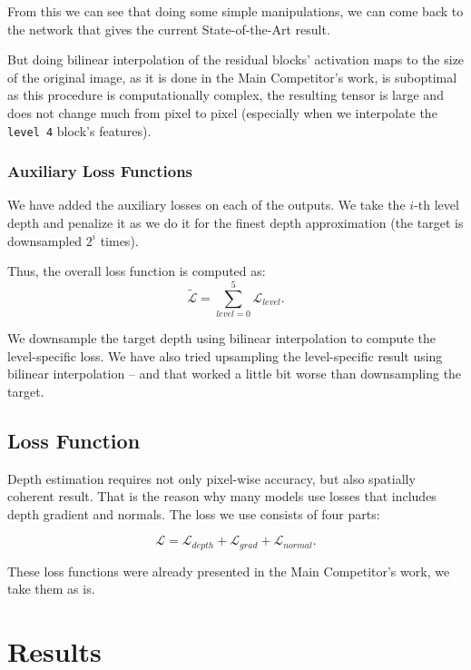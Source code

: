 \documentclass[10pt,twocolumn,letterpaper]{article}
\begin{document}
From this we can see that doing some simple manipulations, we can
come back to the network that gives the current State-of-the-Art result.

But doing bilinear interpolation of the residual blocks' activation maps
to the size of the original image, as it is done in the Main Competitor's work,
is suboptimal as this procedure is
computationally complex, the resulting tensor is large and does not change much from
pixel to pixel (especially when we interpolate the \texttt{level 4}
block's features).

\subsubsection{Auxiliary Loss Functions}

We have
added the auxiliary losses on each of the outputs. We take the $i$-th level depth
and penalize it as we do it for the finest depth approximation (the target is downsampled
$2^i$ times).

Thus, the overall loss function is computed as:
\begin{equation}
    \mathcal{\tilde{L}} = \sum_{level=0}^5 \mathcal{L}_{level}.
\end{equation}

We downsample the target depth using bilinear interpolation to compute the level-specific loss.
We have also tried upsampling the level-specific result using bilinear interpolation -- 
and that worked a little bit worse than downsampling the target.

\subsection{Loss Function}

Depth estimation requires not only pixel-wise accuracy, but also spatially 
coherent result. That is the reason why many models use losses that includes 
depth gradient and normals. The loss we use consists of four parts:

\begin{equation}
    \mathcal{L} = \mathcal{L}_{depth} + \mathcal{L}_{grad} + \mathcal{L}_{normal}.
\end{equation}

These loss functions were already presented in the 
Main Competitor's work, we take them as is. 

\section{Results}
\end{document}
